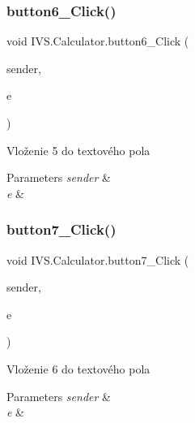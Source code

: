 \subsubsection{\texorpdfstring{button6\+\_\+\+Click()}{button6\_Click()}}
{\footnotesize\ttfamily void I\+V\+S.\+Calculator.\+button6\+\_\+\+Click (\begin{DoxyParamCaption}\item[{object}]{sender,  }\item[{Event\+Args}]{e }\end{DoxyParamCaption})\hspace{0.3cm}{\ttfamily [protected]}}



Vloženie \textquotesingle{}5\textquotesingle{} do textového pola 


\begin{DoxyParams}{Parameters}
{\em sender} & \\
\hline
{\em e} & \\
\hline
\end{DoxyParams}
\mbox{\label{class_i_v_s_1_1_calculator_ab96b96bb1f464fa88084118d38bc9d9e}} 
\subsubsection{\texorpdfstring{button7\+\_\+\+Click()}{button7\_Click()}}
{\footnotesize\ttfamily void I\+V\+S.\+Calculator.\+button7\+\_\+\+Click (\begin{DoxyParamCaption}\item[{object}]{sender,  }\item[{Event\+Args}]{e }\end{DoxyParamCaption})\hspace{0.3cm}{\ttfamily [protected]}}



Vloženie \textquotesingle{}6\textquotesingle{} do textového pola 


\begin{DoxyParams}{Parameters}
{\em sender} & \\
\hline
{\em e} & \\
\hline
\end{DoxyParams}
\mbox{\label{class_i_v_s_1_1_calculator_a7de16fbeb3e7bea132d8540dde1cd110}} 
